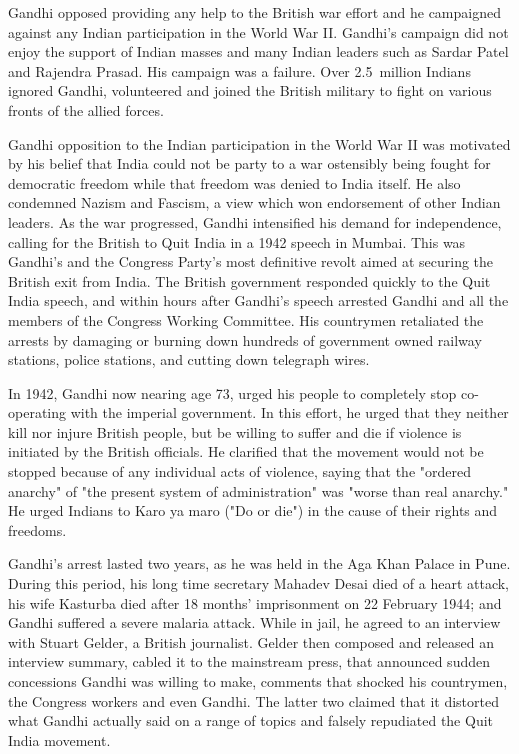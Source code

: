 Gandhi opposed providing any help to the British war effort and he
campaigned against any Indian participation in the World War II.
Gandhi's campaign did not enjoy the support of Indian masses and many
Indian leaders such as Sardar Patel and Rajendra Prasad. His campaign
was a failure. Over 2.5~million Indians ignored Gandhi, volunteered and
joined the British military to fight on various fronts of the allied
forces.

Gandhi opposition to the Indian participation in the World War II was
motivated by his belief that India could not be party to a war
ostensibly being fought for democratic freedom while that freedom was
denied to India itself. He also condemned Nazism and Fascism, a view
which won endorsement of other Indian leaders. As the war progressed,
Gandhi intensified his demand for independence, calling for the British
to Quit India in a 1942 speech in Mumbai. This was Gandhi's and the
Congress Party's most definitive revolt aimed at securing the British
exit from India. The British government responded quickly to the Quit
India speech, and within hours after Gandhi's speech arrested Gandhi and
all the members of the Congress Working Committee. His countrymen
retaliated the arrests by damaging or burning down hundreds of
government owned railway stations, police stations, and cutting down
telegraph wires.

In 1942, Gandhi now nearing age 73, urged his people to completely stop
co-operating with the imperial government. In this effort, he urged that
they neither kill nor injure British people, but be willing to suffer
and die if violence is initiated by the British officials. He clarified
that the movement would not be stopped because of any individual acts of
violence, saying that the "ordered anarchy" of "the present system of
administration" was "worse than real anarchy." He urged Indians to Karo
ya maro ("Do or die") in the cause of their rights and freedoms.

Gandhi's arrest lasted two years, as he was held in the Aga Khan Palace
in Pune. During this period, his long time secretary Mahadev Desai died
of a heart attack, his wife Kasturba died after 18 months' imprisonment
on 22 February 1944; and Gandhi suffered a severe malaria attack. While
in jail, he agreed to an interview with Stuart Gelder, a British
journalist. Gelder then composed and released an interview summary,
cabled it to the mainstream press, that announced sudden concessions
Gandhi was willing to make, comments that shocked his countrymen, the
Congress workers and even Gandhi. The latter two claimed that it
distorted what Gandhi actually said on a range of topics and falsely
repudiated the Quit India movement.

